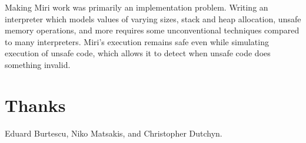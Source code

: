 \documentclass[twocolumn]{article}
\begin{document}
Making Miri work was primarily an implementation problem. Writing an interpreter which models values
of varying sizes, stack and heap allocation, unsafe memory operations, and more requires some
unconventional techniques compared to many interpreters. Miri's execution remains safe even while
simulating execution of unsafe code, which allows it to detect when unsafe code does something
invalid.


\section{Thanks}

Eduard Burtescu, Niko Matsakis, and Christopher Dutchyn.
\end{document}
